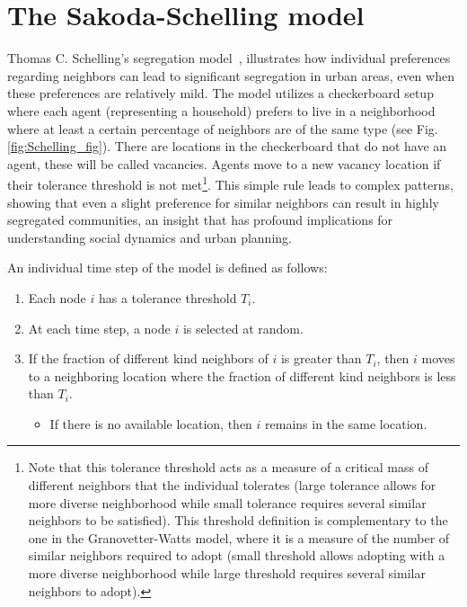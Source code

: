 \section{\label{sec:The Sakoda-Schelling model} The Sakoda-Schelling model}

Thomas C. Schelling's segregation model~\cite{schelling-1969}, illustrates how individual preferences regarding neighbors can lead to significant segregation in urban areas, even when these preferences are relatively mild. The model utilizes a checkerboard setup where each agent (representing a household) prefers to live in a neighborhood where at least a certain percentage of neighbors are of the same type (see Fig. \ref{fig:Schelling_fig}). There are locations in the checkerboard that do not have an agent, these will be called vacancies. Agents move to a new vacancy location if their tolerance threshold is not met\footnote{\sffamily\small Note that this  tolerance threshold acts as a measure of a critical mass of different neighbors that the individual tolerates (large tolerance allows for more diverse neighborhood while small tolerance requires several similar neighbors to be satisfied). This threshold definition is complementary to the one in the Granovetter-Watts model, where it is a measure of the number of similar neighbors required to adopt (small threshold allows adopting with a more diverse neighborhood while large threshold requires several similar neighbors to adopt).}. This simple rule leads to complex patterns, showing that even a slight preference for similar neighbors can result in highly segregated communities, an insight that has profound implications for understanding social dynamics and urban planning. 
\pagebreak

\begin{theorem}
    \sffamily\small
    An individual time step of the model is defined as follows:
    \begin{enumerate}
        \item Each node $i$ has a tolerance threshold $T_i$.
        \item At each time step, a node $i$ is selected at random.
        \item If the fraction of different kind neighbors of $i$ is greater than $T_i$, then $i$ moves to a neighboring location where the fraction of different kind neighbors is less than $T_i$.
            \begin{itemize}
                \item If there is no available location, then $i$ remains in the same location.
            \end{itemize}
    \end{enumerate}
\end{theorem}

